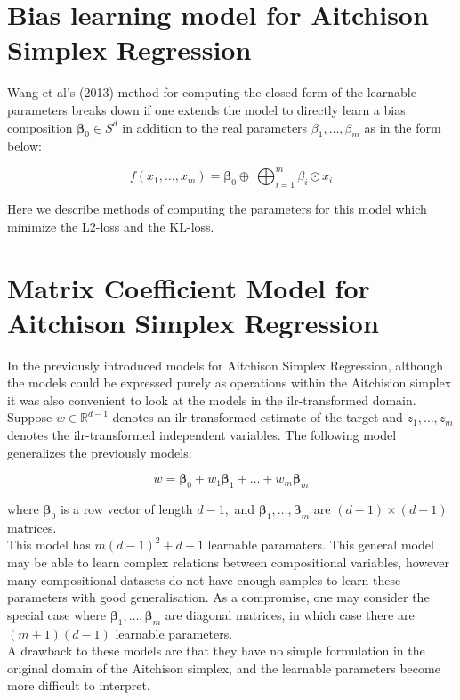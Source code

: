 \documentclass[BSc]{usydthesis}
\numberwithin{equation}{chapter}
\theoremstyle{remark}
\begin{document}
\section{Bias learning model for Aitchison Simplex Regression}

Wang et al's (2013) method for computing the closed form of the learnable parameters breaks down if one extends the model to directly learn a bias composition $\bm{\beta}_0 \in S^d$ in addition to the real parameters $\beta_1,\ldots, \beta_m$ as in the form below:

$$ f(x_1, \ldots, x_m) = \bm{\beta}_0 \oplus \ \bigoplus_{i=1}^m \beta_i \odot x_i $$

Here we describe methods of computing the parameters for this model which minimize the L2-loss and the KL-loss.

\section{Matrix Coefficient Model for Aitchison Simplex Regression}

In the previously introduced models for Aitchison Simplex Regression, although the models could be expressed purely as operations within the Aitchision simplex it was also convenient to look at the models in the ilr-transformed domain. Suppose $w\in \mathbb{R}^{d-1}$ denotes an ilr-transformed estimate of the target and $z_1, \ldots, z_m$ denotes the ilr-transformed independent variables. The following model generalizes the previously models:

$$ w = \bm{\beta}_0 + w_1 \bm{\beta}_1 + \ldots + w_m \bm{\beta}_m$$

where $\bm{\beta}_0$ is a row vector of length $d-1,$ and $\bm{\beta}_1, \ldots, \bm{\beta}_m$ are $(d-1) \times (d-1)$ matrices.  
\\
This model has $m(d-1)^2 + d-1$ learnable paramaters. This general model may be able to learn complex relations between compositional variables, however many compositional datasets do not have enough samples to learn these parameters with good generalisation. As a compromise, one may consider the special case where $\bm{\beta}_1, \ldots, \bm{\beta}_m$ are diagonal matrices, in which case there are $(m+1)(d-1)$ learnable parameters.
\\
A drawback to these models are that they have no simple formulation in the original domain of the Aitchison simplex, and the learnable parameters become more difficult to interpret. \\
\end{document}
